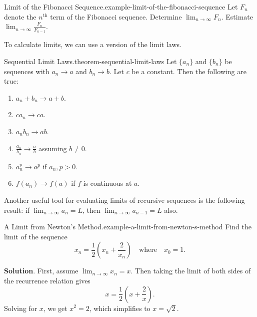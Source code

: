 \documentclass[10pt,]{book}
\numberwithin{equation}{section}
\newcommand{\gt}{>}
\begin{document}
\begin{example}{Limit of the Fibonacci Sequence.}{example-limit-of-the-fibonacci-sequence}%
\hypertarget{p-806}{}%
Let \(F_{n}\) denote the \(n^{\text{th}}\) term of the Fibonacci sequence. Determine \(\lim_{n\to\infty}F_{n}\). Estimate \(\lim_{n\to\infty}\frac{F_{n}}{F_{n-1}}\).%
\end{example}
\hypertarget{p-807}{}%
To calculate limits, we can use a version of the limit laws.%
\begin{theorem}{Sequential Limit Laws.}{}{theorem-sequential-limit-laws}%
\hypertarget{p-808}{}%
Let \(\{a_{n}\}\) and \(\{b_{n}\}\) be sequences with \(a_{n}\to a\) and \(b_{n}\to b\). Let \(c\) be a constant. Then the following are true:%
\leavevmode%
\begin{enumerate}
\item\hypertarget{li-82}{}\(a_{n} + b_{n} \to a + b.\)%
\item\hypertarget{li-83}{}\(ca_{n}\to ca.\)%
\item\hypertarget{li-84}{}\(a_{n}b_{n}\to ab.\)%
\item\hypertarget{li-85}{}\(\frac{a_{n}}{b_{n}}\to\frac{a}{b}\) assuming \(b\neq 0\).%
\item\hypertarget{li-86}{}\(a_{n}^{p}\to a^{p}\) if \(a_{n},p \gt 0\).%
\item\hypertarget{li-87}{}\(f(a_{n})\to f(a)\) if \(f\) is continuous at \(a\).%
\end{enumerate}
\end{theorem}
\hypertarget{p-809}{}%
Another useful tool for evaluating limits of recursive sequences is the following result: if \(\lim_{n\to\infty}a_{n} = L\), then \(\lim_{n\to\infty}a_{n-1} = L\) also.%
\begin{example}{A Limit from Newton's Method.}{example-a-limit-from-newton-s-method}%
\hypertarget{p-810}{}%
Find the limit of the sequence%
\begin{equation*}
x_{n} = \frac{1}{2}\left(x_{n} + \frac{2}{x_{n}}\right)\quad\text{where}\quad x_{0} = 1\text{.}
\end{equation*}
%
\par\smallskip%
\noindent\textbf{Solution}.\hypertarget{solution-167}{}\quad%
\hypertarget{p-811}{}%
First, assume \(\lim_{n\to\infty}x_{n} = x\). Then taking the limit of both sides of the recurrence relation gives%
\begin{equation*}
x = \frac{1}{2}\left(x + \frac{2}{x}\right)\text{.}
\end{equation*}
Solving for \(x\), we get \(x^{2} = 2\), which simplifies to \(x = \sqrt{2}\).%
\end{example}
\end{document}
